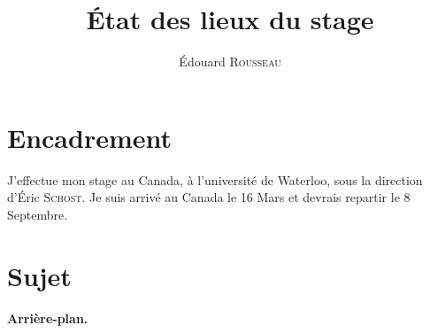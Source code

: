 \documentclass[a4paper,11pt]{article}
\title{État des lieux du stage}
\author{Édouard \textsc{Rousseau}}
\theoremstyle{break}
\theoremstyle{sc}
\theoremstyle{definition}
\theoremstyle{remark}
\begin{document}
\maketitle





\section{Encadrement}

J'effectue mon stage au Canada, à l'université de Waterloo, sous la direction
d'Éric \textsc{Schost}. Je suis arrivé au Canada le 16 Mars et devrais repartir le 8
Septembre.

\section{Sujet}

\paragraph{Arrière-plan.} 
\end{document}
